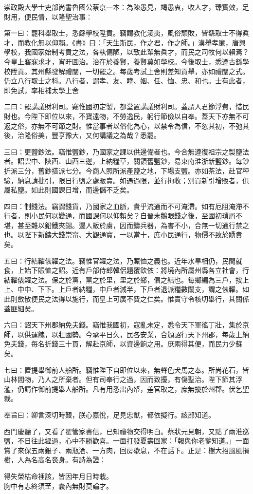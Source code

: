 \begin{myquote}[\markfont]
崇政殿大學士吏部尚書魯國公蔡京一本：為陳愚見，竭愚衷，收人才，臻實效，足財用，便民情，以隆聖治事：{}

第一曰：罷科舉取士，悉繇學校陞貢。竊謂教化淩夷，風俗頹敗，皆繇取士不得眞才，而教化無以仰賴。《書》曰：「天生斯民，作之君，作之師。」漢舉孝廉，唐興學校，我國家始制考貢之法，各執偏陋，以致此輩無眞才，而民之司牧何以賴焉？今皇上寤寐求才，宵旰圖治。治在於養賢，養賢莫如學校。今後取士，悉遵古繇學校陞貢。其州縣發解禮闈，一切罷之。每歲考試上舍則差知貢舉，亦如禮闈之式。仍立八行取士之科。八行者，謂孝、友、睦、姻、任、恤、忠、和也。士有此者，即免試，率相補太學上舍

二曰：罷講議財利司。竊惟國初定製，都堂置講議財利司。蓋謂人君節浮費，惜民財也。今陛下即位以來，不寶遠物，不勞逸民，躬行節儉以自奉。蓋天下亦無不可返之俗，亦無不可節之財。惟當事者以俗化為心，以禁令為信，不忽其初，不弛其後，治隆俗美，豐亨豫大，又何講議之為哉？悉罷。

三曰：更鹽鈔法。竊惟鹽鈔，乃國家之課以供邊備者也。今合無遵復祖宗之製鹽法者。詔雲中、陝西、山西三邊，上納糧草，關領舊鹽鈔，易東南淮浙新鹽鈔。每鈔折派三分，舊鈔搭派七分。今商人照所派產鹽之地，下場支鹽。亦如茶法，赴官秤驗，納息請批引，限日行鹽之處販賣。如遇過限，並行拘收；別買新引增販者，俱屬私鹽。如此則國課日增，而邊儲不乏矣。

四曰：制錢法。竊謂錢貨，乃國家之血脈，貴乎流通而不可淹滯。如有厄阻淹滯不行者，則小民何以變通，而國課何以仰賴矣？自晉末鵝眼錢之後，至國初瑣屑不堪，甚至雜以鉛鐵夾錫。邊人販於虜，因而鑄兵器，為害不小，合無一切通行禁之也。以陛下新鑄大錢崇甯、大觀通寶，一以當十，庶小民通行，物價不致於踴貴矣。

五曰：行結糶俵糴之法。竊惟官糴之法，乃賑恤之義也。近年水旱相仍，民間就食，上始下賑恤之詔。近有戶部侍郎韓侶題覆欽依：將境內所屬州縣各立社會，行結糶俵糴之法。保之於黨，黨之於里，里之於鄉，倡之結也。每鄉編為三戶，按上上、中中、下下。上戶者納糧，中戶者減半，下戶者退派糧數關支，謂之俵糶。如此則斂散便民之法得以施行，而皇上可廣不費之仁矣。惟責守令核切舉行，其關係蓋匪細矣。

六曰：詔天下州郡納免夫錢。竊惟我國初，寇亂未定，悉令天下軍徭丁壯，集於京師，以供運餽，以壯國勢。今承平日久，民各安業，合頒詔行天下州郡，每歲上納免夫錢，每名折錢三十貫，解赴京師，以資邊餉之用。庶兩得其便，而民力少蘇矣。

七曰：置提舉御前人船所。竊惟陛下自即位以來，無聲色犬馬之奉。所尚花石，皆山林間物，乃人之所棄者。但有司奉行之過，因而致擾，有傷聖治。陛下節其浮濫，仍請作御前提舉人船所。凡有用悉出內帑，差官取之，庶無擾於州郡。伏乞聖裁。{}

奉旨曰：卿言深切時艱，朕心嘉悅，足見忠猷，都依擬行。該部知道。
\end{myquote}

西門慶聽了，又看了翟管家書信，已知禮物交得明白。蔡狀元見朝，又點了兩淮巡鹽，不日往此經過，心中不勝歡喜。一面打發夏壽回家：「報與你老爹知道。」一面賞了來保五兩銀子、兩瓶酒、一方肉，回房歇息，不在話下。正是：樹大招風風損樹，人為名高名䘮身。有詩為證：

\begin{myquote}
得失榮枯命裡該，皆因年月日時栽。\\胸中有志終須至，囊內無財莫論才。
\end{myquote}
